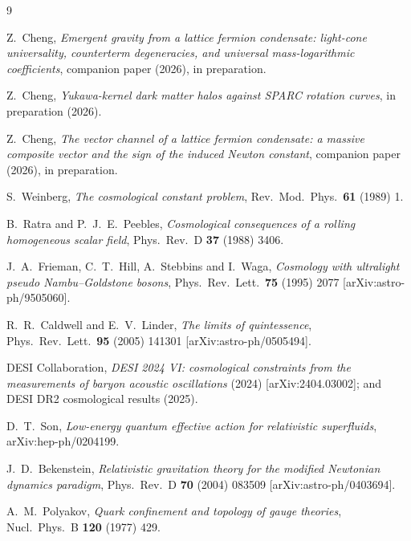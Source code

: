 \documentclass[11pt]{article}
\begin{document}
\begin{thebibliography}{9}

Z.~Cheng,
\emph{Emergent gravity from a lattice fermion condensate:
light-cone universality, counterterm degeneracies, and universal
mass-logarithmic coefficients},
companion paper (2026), in preparation.

Z.~Cheng,
\emph{Yukawa-kernel dark matter halos against SPARC rotation
curves}, in preparation (2026).

Z.~Cheng,
\emph{The vector channel of a lattice fermion condensate: a massive
composite vector and the sign of the induced Newton constant},
companion paper (2026), in preparation.

S.~Weinberg,
\emph{The cosmological constant problem},
Rev.\ Mod.\ Phys.\ \textbf{61} (1989) 1.

B.~Ratra and P.~J.~E.~Peebles,
\emph{Cosmological consequences of a rolling homogeneous scalar
field},
Phys.\ Rev.\ D \textbf{37} (1988) 3406.

J.~A.~Frieman, C.~T.~Hill, A.~Stebbins and I.~Waga,
\emph{Cosmology with ultralight pseudo Nambu--Goldstone bosons},
Phys.\ Rev.\ Lett.\ \textbf{75} (1995) 2077
[arXiv:astro-ph/9505060].

R.~R.~Caldwell and E.~V.~Linder,
\emph{The limits of quintessence},
Phys.\ Rev.\ Lett.\ \textbf{95} (2005) 141301
[arXiv:astro-ph/0505494].

DESI Collaboration,
\emph{DESI 2024 VI: cosmological constraints from the measurements of
baryon acoustic oscillations} (2024)
[arXiv:2404.03002]; and DESI DR2 cosmological results (2025).

D.~T.~Son,
\emph{Low-energy quantum effective action for relativistic
superfluids},
arXiv:hep-ph/0204199.

J.~D.~Bekenstein,
\emph{Relativistic gravitation theory for the modified Newtonian
dynamics paradigm},
Phys.\ Rev.\ D \textbf{70} (2004) 083509
[arXiv:astro-ph/0403694].

A.~M.~Polyakov,
\emph{Quark confinement and topology of gauge theories},
Nucl.\ Phys.\ B \textbf{120} (1977) 429.


\end{thebibliography}
\end{document}
